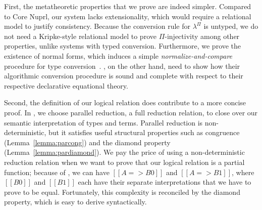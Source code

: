 \documentclass[\ifpublic nolinenum\else\fi,online,OA]{jfp}
\newcommand{\scw}[1]{}
\newcommand{\yl}[1]{}
\newcommand{\lang}{$\lambda^{\Pi}$\xspace}
\theoremstyle{definition}
\begin{document}
First, the metatheoretic properties that we prove are indeed
simpler. Compared to Core Nuprl, our system
lacks extensionality, which would require a relational model to
justify consistency. Because the conversion rule for
\lang{} is untyped, we do not
need a Kripke-style relational model to prove $\Pi$-injectivity
among other properties, unlike systems with typed conversion. Furthermore, we prove the existence of normal
forms, which induces a simple \emph{normalize-and-compare}
procedure for type
conversion~\cite{pierce2004advanced}. \citet{nbeincoq, decagda}, on
the other hand, need
to show how their algorithmic conversion procedure is sound and complete
with respect to their respective declarative equational theory.
\scw{I'm getting confused by this paragraph. Does this reorganization sense:
  Our language is simpler than Nuprl, because it doesn't have extensional
  equality. It is simpler than Agda, because it doesn't have type-directed
  equality. Both of these cases require the definition of a binary logical
  relation, that defines a notion of semantic equality between terms. This
  relation justifies the injectivity of $\Pi$ types and justify the validity
  of $\eta$-conversion among other properties.}  \scw{Furthermore our proof is
  also simpler because we don't need prove the correctness of the NBE
  algorithm, which is used to show the decidability of Agda's type-directed
  equivalence. Therefore, we don't need to define this algorithm and show that
  it is sound and complete with respect to the type-directed
  equality. Instead, to show the decidability of our untyped equivalence, we
  need only show that terms have $\beta\eta$ normal forms. }
\yl{Makes sense. Though Abel's work doesn't use nbe but a recursive
  binary algorithm. Rewrote the paragraph above and commented out the original}

Second, the definition of our logical relation does
contribute to a more concise proof.
In , we choose parallel reduction, a full
reduction relation, to close over our semantic interpretation of types
and terms. Parallel reduction is non-deterministic, but it satisfies
useful structural properties such as congruence
(Lemma~\ref{lemma:parcong}) and the diamond property
(Lemma~\ref{lemma:pardiamond}). We pay the price of using a
non-deterministic reduction relation when we want to prove that our
logical relation is a partial function; because of , we
can have $[[A => B0]]$ and $[[A => B1]]$, where $[[B0]]$ and $[[B1]]$
each have their separate interpretations that we have to prove to be
equal. Fortunately, this complexity is reconciled by the
diamond property, which is easy to derive syntactically.
\end{document}
